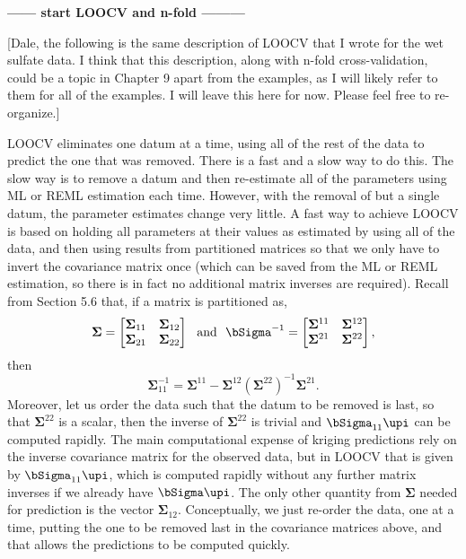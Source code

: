 \documentclass[12pt, titlepage]{article}
\begin{document}
{\large \center \textbf{ ------ start LOOCV and n-fold ---------}}
\vspace{.3cm}

[Dale, the following is the same description of LOOCV that I wrote for the wet sulfate data.  I think that this description, along with n-fold cross-validation, could be a topic in Chapter 9 apart from the examples, as I will likely refer to them for all of the examples.  I will leave this here for now.  Please feel free to re-organize.]


LOOCV eliminates one datum at a time, using all of the rest of the data to predict the one that was removed.  There is a fast and a slow way to do this.  The slow way is to remove a datum and then re-estimate all of the parameters using ML or REML estimation each time.  However, with the removal of but a single datum, the parameter estimates change very little.  A fast way to achieve LOOCV is based on holding all parameters at their values as estimated by using all of the data, and then using results from partitioned matrices so that we only have to invert the covariance matrix once (which can be saved from the ML or REML estimation, so there is in fact no additional matrix inverses are required).  Recall from Section 5.6 that,
if a matrix is partitioned as,
$$
    \boldsymbol{\Sigma} = 
    \begin{bmatrix}
       \boldsymbol{\Sigma}_{11} & \boldsymbol{\Sigma}_{12} \\
       \boldsymbol{\Sigma}_{21} & \boldsymbol{\Sigma}_{22}
    \end{bmatrix}  \ \textrm{ and } \  
    \bSigma^{-1} = 
    \begin{bmatrix}
       \boldsymbol{\Sigma}^{11} & \boldsymbol{\Sigma}^{12} \\
       \boldsymbol{\Sigma}^{21} & \boldsymbol{\Sigma}^{22}
    \end{bmatrix}, 
$$
then 
$$
    \boldsymbol{\Sigma}_{11}^{-1} = \boldsymbol{\Sigma}^{11} - \boldsymbol{\Sigma}^{12} (\boldsymbol{\Sigma}^{22})^{-1} \boldsymbol{\Sigma}^{21}.
$$
Moreover, let us order the data such that the datum to be removed is last, so that $\boldsymbol{\Sigma}^{22}$ is a scalar, then the inverse of $\boldsymbol{\Sigma}^{22}$ is trivial and $\bSigma_{11} \upi$ can be computed rapidly. The main computational expense of kriging predictions rely on the inverse covariance matrix for the observed data, but in LOOCV that is given by $\bSigma_{11} \upi$, which is computed rapidly without any further matrix inverses if we already have $\bSigma \upi$. The only other quantity from $\boldsymbol{\Sigma}$ needed for prediction is the vector $\boldsymbol{\Sigma}_{12}$.  Conceptually, we just re-order the data, one at a time, putting the one to be removed last in the covariance matrices above, and that allows the predictions to be computed quickly.
\end{document}
